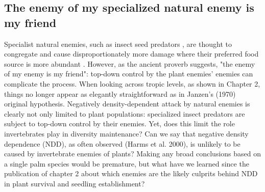 \documentclass[b5paper,justified]{tufte-book} %
\begin{document}
\begin{fullwidth}
\subsection{The enemy of my specialized natural enemy is my friend}
Specialist natural enemies, such as insect seed predators \citep{Lewis2008}, are thought to congregate and cause disproportionately more damage where their preferred food source is more abundant \citep{Hammond1998}. However, as the ancient proverb suggests, "the enemy of my enemy is my friend": top-down control by the plant enemies' enemies can complicate the process. When looking across tropic levels, as shown in Chapter 2, things no longer appear as elegantly straightforward as in Janzen's (1970) original hypothesis. Negatively density-dependent attack by natural enemies is clearly not only limited to plant populations: specialized insect predators are subject to top-down control by their enemies. Yet, does this limit the role invertebrates play in diversity maintenance? Can we say that negative density dependence (NDD), as often observed (Harms et al. 2000), is unlikely to be caused by invertebrate enemies of plants? Making any broad conclusions based on a single palm species would be premature, but what have we learned since the publication of chapter 2 \citep{Visser2011a} about which enemies are the likely culprits behind NDD in plant survival and seedling establishment? \end{fullwidth} \vspace{-.5cm}
\end{document}
